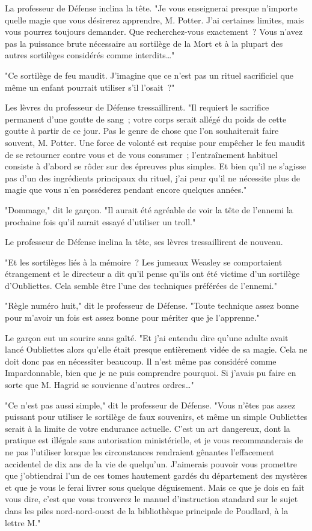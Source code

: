 La professeur de Défense inclina la tête. "Je vous enseignerai presque n'importe quelle magie que vous désirerez apprendre, M. Potter. J'ai certaines limites, mais vous pourrez toujours demander. Que recherchez-vous exactement~? Vous n'avez pas la puissance brute nécessaire au sortilège de la Mort et à la plupart des autres sortilèges considérés comme interdits…"

"Ce sortilège de feu maudit. J'imagine que ce n'est pas un rituel sacrificiel que même un enfant pourrait utiliser s'il l'osait~?"

Les lèvres du professeur de Défense tressaillirent. "Il requiert le sacrifice permanent d'une goutte de sang~; votre corps serait allégé du poids de cette goutte à partir de ce jour. Pas le genre de chose que l'on souhaiterait faire souvent, M. Potter. Une force de volonté est requise pour empêcher le feu maudit de se retourner contre vous et de vous consumer~; l'entraînement habituel consiste à d'abord se rôder sur des épreuves plus simples. Et bien qu'il ne s'agisse pas d'un des ingrédients principaux du rituel, j'ai peur qu'il ne nécessite plus de magie que vous n'en posséderez pendant encore quelques années."

"Dommage," dit le garçon. "Il aurait été agréable de voir la tête de l'ennemi la prochaine fois qu'il aurait essayé d'utiliser un troll."

Le professeur de Défense inclina la tête, ses lèvres tressaillirent de nouveau.

"Et les sortilèges liés à la mémoire~? Les jumeaux Weasley se comportaient étrangement et le directeur a dit qu'il pense qu'ils ont été victime d'un sortilège d'Oubliettes. Cela semble être l'une des techniques préférées de l'ennemi."

"Règle numéro huit," dit le professeur de Défense. "Toute technique assez bonne pour m'avoir un fois est assez bonne pour mériter que je l'apprenne."

Le garçon eut un sourire sans gaîté. "Et j'ai entendu dire qu'une adulte avait lancé Oubliettes alors qu'elle était presque entièrement vidée de sa magie. Cela ne doit donc pas en nécessiter beaucoup. Il n'est même pas considéré comme Impardonnable, bien que je ne puis comprendre pourquoi. Si j'avais pu faire en sorte que M. Hagrid se souvienne d'autres ordres…"

"Ce n'est pas aussi simple," dit le professeur de Défense. "Vous n'êtes pas assez puissant pour utiliser le sortilège de faux souvenirs, et même un simple Oubliettes serait à la limite de votre endurance actuelle. C'est un art dangereux, dont la pratique est illégale sans autorisation ministérielle, et je vous recommanderais de ne pas l'utiliser lorsque les circonstances rendraient gênantes l'effacement accidentel de dix ans de la vie de quelqu'un. J'aimerais pouvoir vous promettre que j'obtiendrai l'un de ces tomes hautement gardés du département des mystères et que je vous le ferai livrer sous quelque déguisement. Mais ce que je dois en fait vous dire, c'est que vous trouverez le manuel d'instruction standard sur le sujet dans les piles nord-nord-ouest de la bibliothèque principale de Poudlard, à la lettre M."

